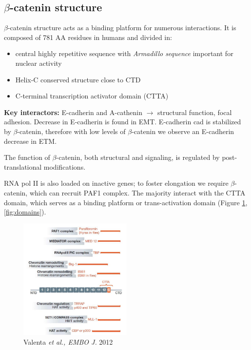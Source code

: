 \hypertarget{ux3b2-catenin-structure}{%
\subsection{$\beta$-catenin structure}\label{ux3b2-catenin-structure}}

$\beta$-catenin structure acts as a binding platform for numerous interactions. It is composed of 781 AA residues in humans and divided in:

\begin{itemize}
\tightlist
\item
  central highly repetitive sequence with \emph{Armadillo sequence} important for nuclear activity
\item
  Helix-C conserved structure close to CTD
\item
  C-terminal transcription activator domain (CTTA)
\end{itemize}

\textbf{Key interactors:} E-cadherin and A-cathenin $\rightarrow$ structural function, focal adhesion. Decrease in E-cadherin is found in EMT. E-cadherin cad is stabilized by $\beta$-catenin, therefore with low levels of $\beta$-catenin we observe an E-cadherin decrease in ETM.

The function of $\beta$-catenin, both structural and signaling, is regulated by post-translational modifications.

RNA pol II is also loaded on inactive genes; to foster elongation we require $\beta$-catenin, which can recruit PAF1 complex. The majority interact with the CTTA domain, which serves as a binding platform or trans-activation domain (Figure \ref{fig:CTTA},\ref{fig:domains}).

\begin{figure}
\centering
\includegraphics[width=0.5\textwidth]{../_resources/Screenshot_2022-10-07_at_11-52-13.png}
\caption{Valenta \emph{et al., EMBO J.} 2012}
\label{fig:CTTA}
\end{figure}


